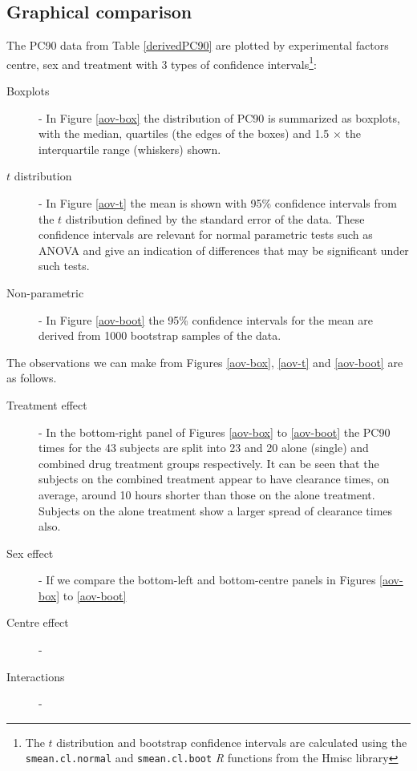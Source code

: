 \subsection{Graphical comparison}
The PC90 data from Table \ref{derivedPC90} are plotted by experimental factors centre, sex and treatment with 3 types of confidence intervals\footnote{The $t$ distribution and bootstrap confidence intervals are calculated using the \texttt{smean.cl.normal} and \texttt{smean.cl.boot} \emph{R} functions from the Hmisc library\cite{Hmisc}}:
\begin{description}
\item[Boxplots] - In Figure \ref{aov-box} the distribution of PC90 is summarized as boxplots, with the median, quartiles (the edges of the boxes) and 1.5 $\times$ the interquartile range (whiskers) shown.
\item[$t$ distribution] - In Figure \ref{aov-t} the mean is shown with 95\% confidence intervals from the $t$ distribution defined by the standard error of the data. These confidence intervals are relevant for normal parametric tests such as ANOVA and give an indication of differences that may be significant under such tests.
\item[Non-parametric] - In Figure \ref{aov-boot} the 95\% confidence intervals for the mean are derived from 1000 bootstrap samples of the data.
\end{description}
The observations we can make from Figures \ref{aov-box}, \ref{aov-t} and \ref{aov-boot} are as follows.
\begin{description}
\item[Treatment effect] - In the bottom-right panel of Figures \ref{aov-box} to \ref{aov-boot} the PC90 times for the 43 subjects are split into 23 and 20 alone (single) and combined drug treatment groups respectively. It can be seen that the subjects on the combined treatment appear to have clearance times, on average, around 10 hours shorter than those on the alone treatment. Subjects on the alone treatment show a larger spread of clearance times also. 
\item[Sex effect] - If we compare the bottom-left and bottom-centre panels in Figures \ref{aov-box} to \ref{aov-boot} 
\item[Centre effect] -
\item[Interactions] - 
\end{description}
